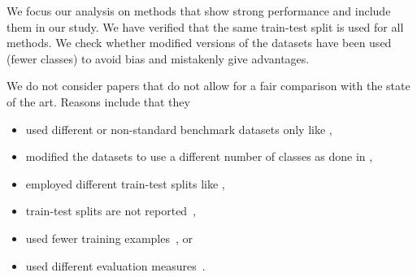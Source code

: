 \documentclass[acmsmall,nonacm]{acmart}
\begin{document}
We focus our analysis on methods that show strong performance and include them in our study.
We have verified that the same train-test split is used for all methods.
We check whether modified versions of the datasets have been used (\eg fewer classes) to avoid bias and mistakenly give advantages.

We do not consider papers that do not allow for a fair comparison with the state of the art.
Reasons include that they 
\begin{itemize}
\item used different or non-standard benchmark datasets only like \cite{
petridis2024textclassificationneuralnetworks,
peng2025text,
petridis2024textclassificationneuralnetworks,
DBLP:journals/nca/JiaJDZLXC23-mhgat,
10748883-boing-aviation-paper,
LMTCSG-10705790,
AGBESI2024e38515,
10.1007/978-3-031-72350-6_20,
DBLP:journals/corr/abs-2408-15650,
Wei_Sun_2024,
DBLP:conf/kdd/Yu00S24,
DBLP:conf/sigir/DaiYCX24, 
DBLP:journals/corr/abs-2403-03293, 
10.1016/j.datak.2024.102306,
DBLP:journals/access/ThaminkaewLV24,
DBLP:journals/tkde/HuLZHNL24,
DBLP:conf/coling/LyKCK24,
JAMSHIDI2024102306,
DBLP:journals/corr/abs-2401-01667-MLP-Compass,
thaminkaew2024ieeeaccess,
li2023chatgpt,yu2023open,yuan2023revisiting,
zhu2023,
chae_davidson_2023,
zhang2023pretraining,
Yang-ClimateChangeClassifiert-2023,
DBLP:journals/apin/TanRW23,
bgnn-xml,
DBLP:conf/ijcnn/TranSZPB22,
LiuEtAl2022-LongText,
DBLP:conf/aiia/BreazzanoC021a,
DBLP:journals/corr/abs-2206-07253,
DBLP:journals/corr/abs-2112-11389,
chalkidis-etal-2020-empirical,
DBLP:conf/eacl/SchwenkBCL17,gururangan-etal-2019-variational},

\item modified the datasets to use a different number of classes as done in \cite{DBLP:conf/coling/ZhouQZXBX16,DBLP:conf/aaai/LaiXLZ15,MTAPparlakNovelFeatureClassbased2023},

\item employed different train-test splits like
\cite{
donabauer2024tokenlevelgraphsshorttext,
DBLP:journals/eswa/ReusensSTSVBB24,
edwards2024language,
StylianouEtAl2023,
DBLP:journals/corr/abs-2211-02563,
DBLP:conf/ijcnn/SunHCYSM22,
raihan2021-survey,
DBLP:conf/icaart/PalSS20,
moreo2020,
canutoThoroughEvaluationDistanceBased2018}, 

\item train-test splits are not reported~\cite{moreo2020,sf-cnn-iasc.2023.027429,YuanEtAl-MSVM-kNN-2008},

\item used fewer training examples~\cite{
DBLP:conf/acl/LiangZ0Z24,
DBLP:conf/aaai/LiuZ0ZWMCYZ24,
Xie2024DataLT,
zhu2023,
duarte2023review,
DBLP:journals/corr/abs-2301-10481,
DBLP:conf/emnlp/ZhengWYD22,
DBLP:conf/ijcnn/SunHCYSM22,DBLP:conf/emnlp/WangWYD21}, 
or

\item used different evaluation measures~\cite{tan2022,DBLP:conf/emnlp/HuangGKOO21}.

\end{itemize}
\end{document}
